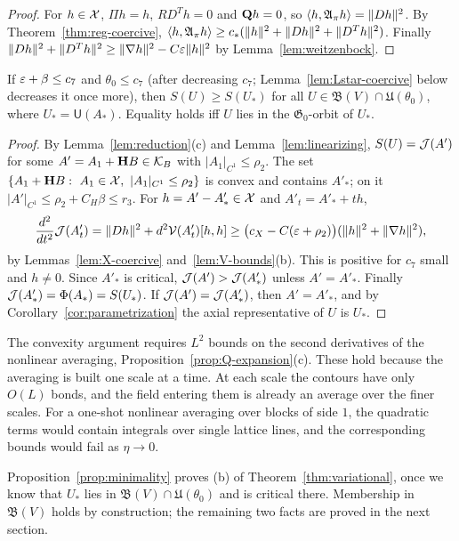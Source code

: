 \begin{proof}
For $h\in\mathcal X$, $\Pi h=h$, $RD^Th=0$ and $\mathbf Q h=0$, so $\langle h,\mathfrak A_\pi h\rangle=\|Dh\|^2$. By Theorem~\ref{thm:reg-coercive}, $\langle h,\mathfrak A_\pi h\rangle\ge c_*(\|h\|^2+\|Dh\|^2+\|D^Th\|^2)$. Finally $\|Dh\|^2+\|D^Th\|^2\ge\|\nabla h\|^2-C\varepsilon\|h\|^2$ by Lemma~\ref{lem:weitzenbock}.
\end{proof}

\begin{proposition}[Minimality]\label{prop:minimality}
If $\varepsilon+\beta\le c_7$ and $\theta_0\le c_7$ (after decreasing $c_7$; Lemma~\ref{lem:Lstar-coercive} below decreases it once more), then $S(U)\ge S(U_*)$ for all $U\in\mathfrak B(V)\cap\mathfrak U(\theta_0)$, where $U_*=\mathsf U(A_*)$. Equality holds iff $U$ lies in the $\mathfrak G_0$-orbit of $U_*$.
\end{proposition}

\begin{proof}
By Lemma~\ref{lem:reduction}(c) and Lemma~\ref{lem:linearizing}, $S(U)=\mathcal J(A')$ for some $A'=A_1+\mathbf H B\in\mathcal K_B$ with $|A_1|_{C^1}\le\rho_2$. The set $\{A_1+\bH B:\ A_1\in\cX,\ |A_1|_{C^1}\le\rho_2\}$ is convex and contains $A'_*$; on it $|A'|_{C^1}\le\rho_2+C_H\beta\le r_3$. For $h=A'-A'_*\in\mathcal X$ and $A'_t=A'_*+th$,
\[
\frac{d^2}{dt^2}\mathcal J(A'_t)=\|Dh\|^2+d^2\mathcal V(A'_t)[h,h]\ge\big(c_X-C(\varepsilon+\rho_2)\big)(\|h\|^2+\|\nabla h\|^2),
\]
by Lemmas~\ref{lem:X-coercive} and~\ref{lem:V-bounds}(b). This is positive for $c_7$ small and $h\ne0$. Since $A'_*$ is critical, $\mathcal J(A')>\mathcal J(A'_*)$ unless $A'=A'_*$. Finally $\mathcal J(A'_*)=\Phi(A_*)=S(U_*)$. If $\mathcal J(A')=\mathcal J(A'_*)$, then $A'=A'_*$, and by Corollary~\ref{cor:parametrization} the axial representative of $U$ is $U_*$.
\end{proof}

The convexity argument requires $L^2$ bounds on the second derivatives of the nonlinear averaging, Proposition~\ref{prop:Q-expansion}(c). These hold because the averaging is built one scale at a time. At each scale the contours have only $O(L)$ bonds, and the field entering them is already an average over the finer scales. For a one-shot nonlinear averaging over blocks of side $1$, the quadratic terms would contain integrals over single lattice lines, and the corresponding bounds would fail as $\eta\to0$.

Proposition~\ref{prop:minimality} proves (b) of Theorem~\ref{thm:variational}, once we know that $U_*$ lies in $\mathfrak B(V)\cap\mathfrak U(\theta_0)$ and is critical there. Membership in $\mathfrak B(V)$ holds by construction; the remaining two facts are proved in the next section.

